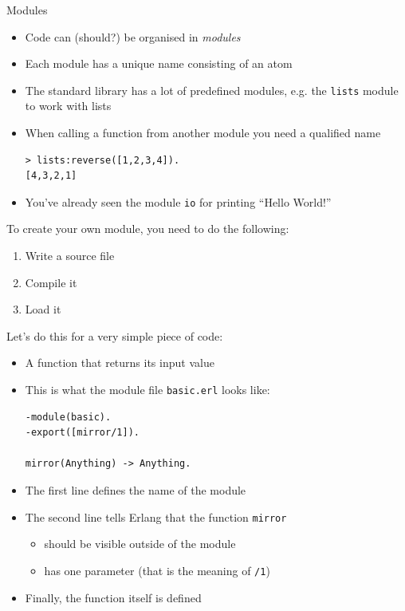 \documentclass[12pt,xcolor=svgnames]{beamer}
\begin{document}
\begin{frame}{Modules}
\begin{itemize}
\item Code can (should?) be organised in \emph{modules}
\item Each module has a unique name consisting of an atom
\item The standard library has a lot of predefined modules, e.g. the \texttt{lists} module to work with lists
\item When calling a function from another module you need a qualified name
\begin{Verbatim}
> lists:reverse([1,2,3,4]).
[4,3,2,1]
\end{Verbatim}
\item You've already seen the module \texttt{io} for printing ``Hello World!''
\end{itemize}

\framebreak

To create your own module, you need to do the following:
\begin{enumerate}
\item Write a source file
\item Compile it
\item Load it
\end{enumerate}
Let's do this for a very simple piece of code:
\begin{itemize}
\item A function that returns its input value
\end{itemize}

\framebreak

\begin{itemize}
\item This is what the module file \texttt{basic.erl} looks like:
\begin{Verbatim}
-module(basic).
-export([mirror/1]).

mirror(Anything) -> Anything.
\end{Verbatim}
\item The first line defines the name of the module
\item The second line tells Erlang that the function \texttt{mirror} 
\begin{itemize}
\item should be visible outside of the module
\item has one parameter (that is the meaning of \texttt{/1})
\end{itemize}
\item Finally, the function itself is defined
\end{itemize}


\end{frame}
\end{document}
